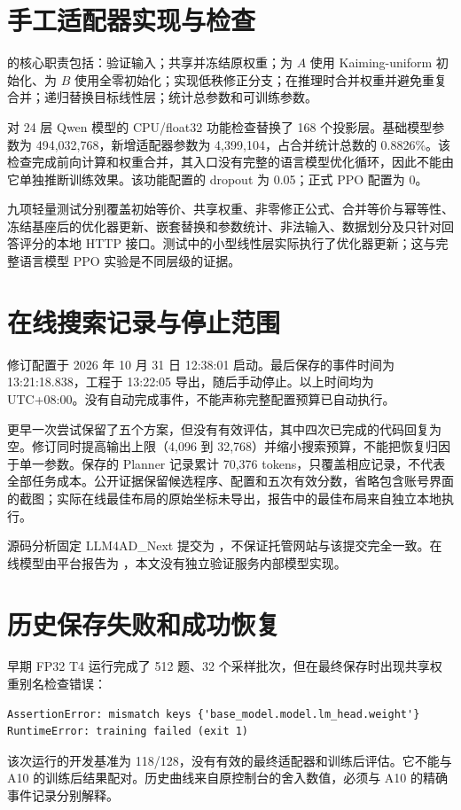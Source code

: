 \section{手工适配器实现与检查}\label{app:implementation-zh}
 的核心职责包括：验证输入；共享并冻结原权重；为 $A$ 使用 Kaiming-uniform 初始化、为 $B$ 使用全零初始化；实现低秩修正分支；在推理时合并权重并避免重复合并；递归替换目标线性层；统计总参数和可训练参数。

对 24 层 Qwen 模型的 CPU/float32 功能检查替换了 168 个投影层。基础模型参数为 494,032,768，新增适配器参数为 4,399,104，占合并统计总数的 0.8826\%。该检查完成前向计算和权重合并，其入口没有完整的语言模型优化循环，因此不能由它单独推断训练效果。该功能配置的 dropout 为 0.05；正式 PPO 配置为 0。

九项轻量测试分别覆盖初始等价、共享权重、非零修正公式、合并等价与幂等性、冻结基座后的优化器更新、嵌套替换和参数统计、非法输入、数据划分及只针对回答评分的本地 HTTP 接口。测试中的小型线性层实际执行了优化器更新；这与完整语言模型 PPO 实验是不同层级的证据。

\section{在线搜索记录与停止范围}\label{app:online-zh}\label{app:source-zh}
修订配置于 2026 年 10 月 31 日 12:38:01 启动。最后保存的事件时间为 13:21:18.838，工程于 13:22:05 导出，随后手动停止。以上时间均为 UTC+08:00。没有自动完成事件，不能声称完整配置预算已自动执行。

更早一次尝试保留了五个方案，但没有有效评估，其中四次已完成的代码回复为空。修订同时提高输出上限（4,096 到 32,768）并缩小搜索预算，不能把恢复归因于单一参数。保存的 Planner 记录累计 70,376 tokens，只覆盖相应记录，不代表全部任务成本。公开证据保留候选程序、配置和五次有效分数，省略包含账号界面的截图；实际在线最佳布局的原始坐标未导出，报告中的最佳布局来自独立本地执行。

源码分析固定 LLM4AD\_Next 提交为 ，不保证托管网站与该提交完全一致。在线模型由平台报告为 ，本文没有独立验证服务内部模型实现。

\section{历史保存失败和成功恢复}\label{app:history-zh}
早期 FP32 T4 运行完成了 512 题、32 个采样批次，但在最终保存时出现共享权重别名检查错误：
\begin{Verbatim}[fontsize=\small,breaklines=true,frame=single]
AssertionError: mismatch keys {'base_model.model.lm_head.weight'}
RuntimeError: training failed (exit 1)
\end{Verbatim}
该次运行的开发基准为 118/128，没有有效的最终适配器和训练后评估。它不能与 A10 的训练后结果配对。历史曲线来自原控制台的舍入数值，必须与 A10 的精确事件记录分别解释。

